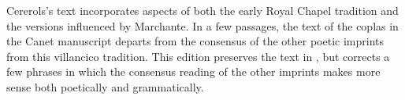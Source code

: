 \documentclass{vcscores}
\begin{document}
Cererols's text incorporates aspects of both the early Royal Chapel tradition and the versions influenced by Marchante.
In a few passages, the text of the coplas in the Canet manuscript departs from the consensus of the other poetic imprints from this villancico tradition.
This edition preserves the text in , but corrects a few phrases in which the consensus reading of the other imprints makes more sense both poetically and grammatically.


\criticalnotesheader

\end{document}
